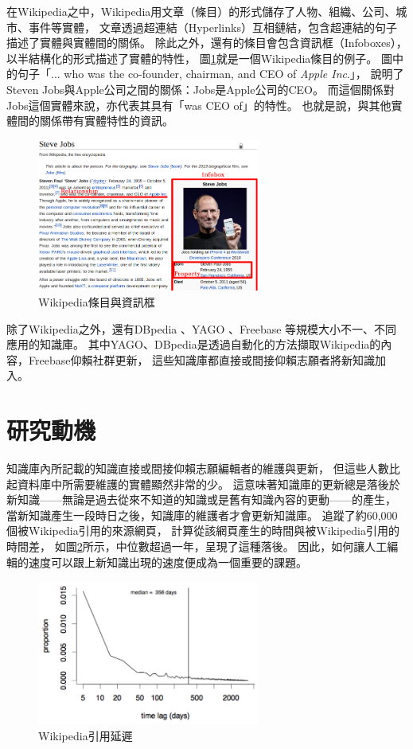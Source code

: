在Wikipedia之中，Wikipedia用文章（條目）的形式儲存了人物、組織、公司、城市、事件等實體，
文章透過超連結（Hyperlinks）互相鏈結，包含超連結的句子描述了實體與實體間的關係。
除此之外，還有的條目會包含資訊框（Infoboxes），以半結構化的形式描述了實體的特性，
圖\ref{i:wiki}就是一個Wikipedia條目的例子。
圖中的句子「... who was the co-founder, chairman, and CEO of \emph{Apple Inc}.」，
說明了Steven Jobs與Apple公司之間的關係：Jobs是Apple公司的CEO。
而這個關係對Jobs這個實體來說，亦代表其具有「was CEO of」的特性。
也就是說，與其他實體間的關係帶有實體特性的資訊。

\begin{figure}
\centering
\includegraphics[width=0.65\textwidth]{images/01-wiki-as-kb}
\caption{Wikipedia條目與資訊框}
\label{i:wiki}
\end{figure}

除了Wikipedia之外，還有DBpedia \citep{dbpedia}、YAGO \citep{yago}、Freebase \citep{freebase}等規模大小不一、不同應用的知識庫。
其中YAGO、DBpedia是透過自動化的方法擷取Wikipedia的內容，Freebase仰賴社群更新，
這些知識庫都直接或間接仰賴志願者將新知識加入。

%
%
\section{研究動機}
知識庫內所記載的知識直接或間接仰賴志願編輯者的維護與更新，
但這些人數比起資料庫中所需要維護的實體顯然非常的少。
這意味著知識庫的更新總是落後於新知識——無論是過去從來不知道的知識或是舊有知識內容的更動——的產生，
當新知識產生一段時日之後，知識庫的維護者才會更新知識庫。
\cite{kba2012}追蹤了約60,000個被Wikipedia引用的來源網頁，
計算從該網頁產生的時間與被Wikipedia引用的時間差，
如圖\ref{i:wikicitenews}所示，中位數超過一年，呈現了這種落後。
因此，如何讓人工編輯的速度可以跟上新知識出現的速度便成為一個重要的課題。

\begin{figure}
    \centering
    \includegraphics[width=0.65\textwidth]{images/01-wiki-cite-delay}
    \caption{Wikipedia引用延遲}
    \label{i:wikicitenews}
\end{figure}

